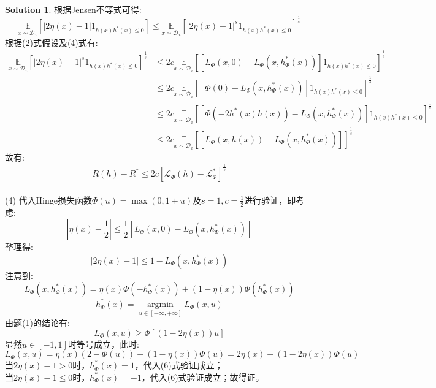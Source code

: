\documentclass[a4paper,UTF8]{article}
\theoremstyle{definition}
\newtheorem*{solution}{Solution}
\begin{document}
\begin{solution}
	根据Jensen不等式可得:
	$$\underset{x \sim \mathcal{D}_{x}}{\mathbb{E}}\left[\left|2\eta(x)-1\right| 1_{h(x) h^{*}(x) \leqslant 0}\right]\leqslant \underset{x \sim \mathcal{D}_{x}}{\mathbb{E}}\left[\left|2\eta(x)-1\right|^s 1_{h(x) h^{*}(x) \leqslant 0}\right]^{\frac{1}{s}}$$	
	根据(2)式假设及(4)式有:
	\begin{equation}\nonumber	
	\begin{aligned}	
	\underset{x \sim \mathcal{D}_{x}}{\mathbb{E}}\left[\left|2\eta(x)-1\right|^s 1_{h(x) h^{*}(x) \leqslant 0}\right]^{\frac{1}{s}} & \leqslant 2c \underset{x \sim \mathcal{D}_{x}}{\mathbb{E}}\left[\left[L_{\Phi}(x, 0)-L_{\Phi}\left(x, h_{\Phi}^{*}(x)\right)\right] 1_{h(x) h^{*}(x) \leqslant 0}\right]^{\frac{1}{s}}\\&\leqslant 2c \underset{x \sim \mathcal{D}_{x}}{\mathbb{E}}\left[\left[\Phi(0)-L_{\Phi}\left(x, h_{\Phi}^{*}(x)\right)\right] 1_{h(x) h^{*}(x) \leqslant 0}\right]^{\frac{1}{s}}\\&\leqslant 2c \underset{x \sim \mathcal{D}_{x}}{\mathbb{E}}\left[\left[\Phi(-2h^*(x)h(x))-L_{\Phi}\left(x, h_{\Phi}^{*}(x)\right)\right] 1_{h(x) h^{*}(x) \leqslant 0}\right]^{\frac{1}{s}}\\&\leqslant 2c \underset{x \sim \mathcal{D}_{x}}{\mathbb{E}}\left[\left[L_{\Phi}\left(x, h(x)\right)-L_{\Phi}\left(x, h_{\Phi}^{*}(x)\right)\right]\right]^{\frac{1}{s}}
	\end{aligned}
	\end{equation}
	故有:
	$$R(h)-R^{*} \leqslant 2 c\left[\mathcal{L}_{\Phi}(h)-\mathcal{L}_{\Phi}^{*}\right]^{\frac{1}{s}}$$
 \\(4) 代入Hinge损失函数$\Phi(u)=\max(0,1+u)$及$s=1,c=\frac{1}{2}$进行验证，即考虑:
 $$\left|\eta(x)-\frac{1}{2}\right| \leqslant \frac{1}{2}\left[L_{\Phi}(x, 0)-L_{\Phi}\left(x, h_{\Phi}^{*}(x)\right)\right]$$ 
 整理得:
 \begin{equation}  
 \left|2\eta(x)-1\right| \leqslant 1-L_{\Phi}\left(x, h_{\Phi}^{*}(x)\right) 
 \end{equation}
 注意到:
 $$L_{\Phi}(x, h_{\Phi}^{*}(x))=\eta(x) \Phi(-h_{\Phi}^{*}(x))+(1-\eta(x)) \Phi(h_{\Phi}^{*}(x))$$
 $$h_{\Phi}^{*}(x)=\underset{u \in[-\infty,+\infty]}{\operatorname{argmin}} L_{\Phi}(x, u)$$
 由题(1)的结论有:
 $$L_{\Phi}(x, u) \geqslant \Phi\left[(1-2\eta(x))u\right]$$
 显然$u \in [-1,1]$时等号成立，此时:$$L_{\Phi}(x, u) = \eta(x)(2-\Phi(u))+(1-\eta(x))\Phi(u)=2\eta(x) + (1-2\eta(x))\Phi(u)$$
 当$2\eta(x)-1>0$时，$h_{\Phi}^*(x) = 1$，代入(6)式验证成立；\\当$2\eta(x)-1\leqslant 0$时，$h_{\Phi}^*(x) = -1$，代入(6)式验证成立；故得证。
\end{solution}
\end{document}
